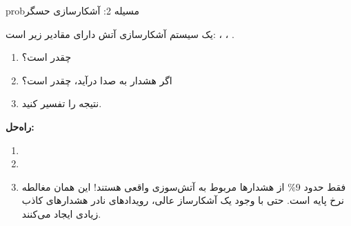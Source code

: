 \begin{PSbox}[unbreakable]{prob}{مسیله 2: آشکارسازی حسگر}

یک سیستم آشکارسازی آتش دارای مقادیر زیر است: ، ، .

\begin{enumerate}
\def\labelenumi{(\PSalph{enumi})}
\tightlist
\item
   چقدر است؟
\item
  اگر هشدار به صدا درآید،  چقدر است؟
\item
  نتیجه را تفسیر کنید.
\end{enumerate}

\textbf{راه‌حل:}

\begin{enumerate}
\def\labelenumi{(\PSalph{enumi})}
\item
  \PSbr{}
\item
  \PSbr{}
\item
  فقط حدود 9\% از هشدارها مربوط به آتش‌سوزی واقعی هستند! این همان مغالطه نرخ پایه است. حتی با وجود یک آشکارساز عالی، رویدادهای نادر هشدارهای کاذب زیادی ایجاد می‌کنند.
\end{enumerate}

\end{PSbox}

